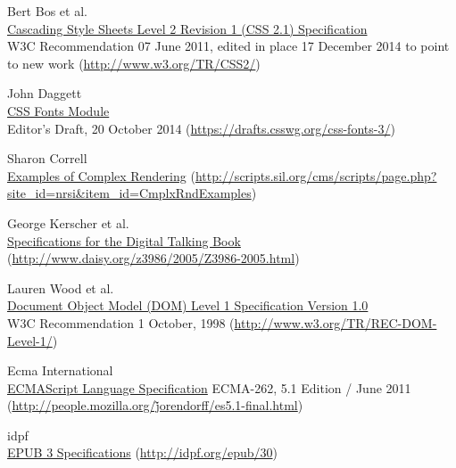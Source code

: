 \begin{thebibliography}{25}

Bert Bos et al. \\
  \href{http://www.w3.org/TR/CSS2/}{Cascading Style Sheets Level 2 Revision 1 (CSS 2.1) Specification} \\
W3C Recommendation 07 June 2011, edited in place 17 December 2014 to point to new work (\href{http://www.w3.org/TR/CSS2/}{http://www.w3.org/TR/CSS2/})

John Daggett \\
\href{https://drafts.csswg.org/css-fonts-3/}{CSS Fonts Module} \\
Editor’s Draft, 20 October 2014 (\href{https://drafts.csswg.org/css-fonts-3/}{https://drafts.csswg.org/css-fonts-3/})

Sharon Correll \\
\href{http://scripts.sil.org/cms/scripts/page.php?site\_id=nrsi\&item\_id=CmplxRndExamples}{Examples of Complex Rendering}
(\href{http://scripts.sil.org/cms/scripts/page.php?site\_id=nrsi\&item\_id=CmplxRndExamples}{http://scripts.sil.org/cms/scripts/page.php?site\_id=nrsi\&item\_id=CmplxRndExamples})

George Kerscher et al. \\
\href{http://www.daisy.org/z3986/2005/Z3986-2005.html}{Specifications for the Digital Talking Book}  (\href{http://www.daisy.org/z3986/2005/Z3986-2005.html}{http://www.daisy.org/z3986/2005/Z3986-2005.html})

  Lauren Wood et al. \\
  \href{http://www.w3.org/TR/REC-DOM-Level-1/}{Document Object Model (DOM) Level 1 Specification Version 1.0} \\
W3C Recommendation 1 October, 1998 (\href{http://www.w3.org/TR/REC-DOM-Level-1/}{http://www.w3.org/TR/REC-DOM-Level-1/})

Ecma International \\
\href{http://people.mozilla.org/~jorendorff/es5.1-final.html}{ECMAScript Language Specification}
ECMA-262, 5.1 Edition / June 2011 (\href{http://people.mozilla.org/\~jorendorff/es5.1-final.html}{http://people.mozilla.org/\~jorendorff/es5.1-final.html})

idpf \\
\href{http://idpf.org/epub/30}{EPUB 3 Specifications}
(\href{http://idpf.org/epub/30}{http://idpf.org/epub/30})


\end{thebibliography}
